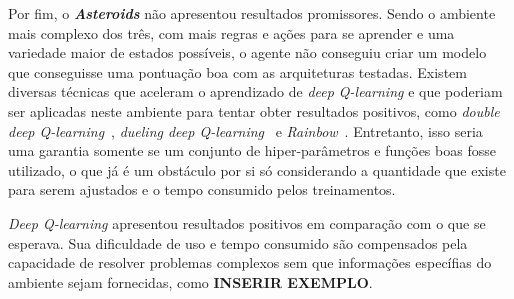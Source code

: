 Por fim, o \textbf{\textit{Asteroids}} não apresentou resultados promissores.
Sendo o ambiente mais complexo dos três, com mais regras e ações para se aprender e uma variedade maior de estados possíveis, o agente não conseguiu criar um modelo que conseguisse uma pontuação boa com as arquiteturas testadas.
Existem diversas técnicas que aceleram o aprendizado de \textit{deep Q-learning} e que poderiam ser aplicadas neste ambiente para tentar obter resultados positivos, como \textit{double deep Q-learning}~\cite{DBLP:journals/corr/HasseltGS15}, \textit{dueling deep Q-learning}~\cite{DBLP:journals/corr/WangFL15} e \textit{Rainbow}~\cite{DBLP:journals/corr/abs-1710-02298}.
Entretanto, isso seria uma garantia somente se um conjunto de hiper-parâmetros e funções boas fosse utilizado, o que já é um obstáculo por si só considerando a quantidade que existe para serem ajustados e o tempo consumido pelos treinamentos.

\textit{Deep Q-learning} apresentou resultados positivos em comparação com o que se esperava.
Sua dificuldade de uso e tempo consumido são compensados pela capacidade de resolver problemas complexos sem que informações específias do ambiente sejam fornecidas, como \textbf{INSERIR EXEMPLO}.


%






